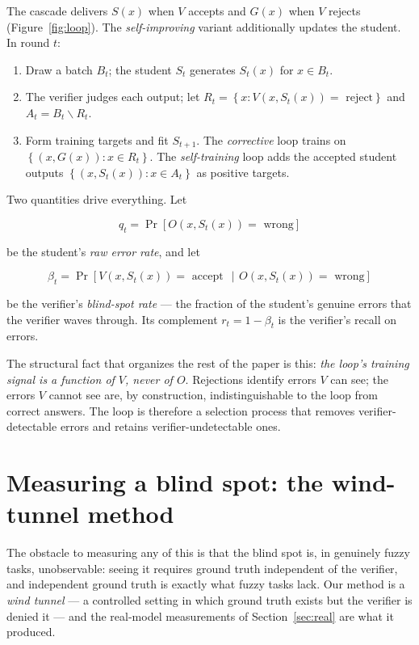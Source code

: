 \documentclass[11pt]{article}
\begin{document}
The cascade delivers \(S(x)\) when \(V\) accepts and \(G(x)\) when \(V\)
rejects (Figure~\ref{fig:loop}). The \emph{self-improving} variant
additionally updates the student. In round \(t\):

\begin{enumerate}
\item
  Draw a batch \(B_{t}\); the student \(S_{t}\) generates \(S_t(x)\)
  for \(x \in B_{t}\).
\item
  The verifier judges each output; let
  \(R_{t} = \left\{ x:V\left( x,S_t(x) \right) = \text{ reject} \right\}\)
  and \(A_{t} = B_{t} \smallsetminus R_{t}\).
\item
  Form training targets and fit \(S_{t + 1}\). The \emph{corrective}
  loop trains on \(\left\{ \left( x,G(x) \right):x \in R_{t} \right\}\).
  The \emph{self-training} loop adds the accepted student outputs
  \(\left\{ \left( x,S_t(x) \right):x \in A_{t} \right\}\) as positive
  targets.
\end{enumerate}

Two quantities drive everything. Let

\[q_{t} = \Pr\left\lbrack O\left( x,S_t(x) \right) = \text{ wrong} \right\rbrack\]

be the student's \emph{raw error rate}, and let

\[\beta_{t} = \Pr\left\lbrack V\left( x,S_t(x) \right) = \text{ accept }\,~|~\, O\left( x,S_t(x) \right) = \text{ wrong} \right\rbrack\]

be the verifier's \emph{blind-spot rate} --- the fraction of the
student's genuine errors that the verifier waves through. Its complement
\(r_{t} = 1 - \beta_{t}\) is the verifier's recall on errors.

The structural fact that organizes the rest of the paper is this:
\emph{the loop's training signal is a function of \(V\), never of
\(O\)}. Rejections identify errors \(V\) can see; the errors \(V\)
cannot see are, by construction, indistinguishable to the loop from
correct answers. The loop is therefore a selection process that removes
verifier-detectable errors and retains verifier-undetectable ones.

\section{Measuring a blind spot: the wind-tunnel method}

\protect{}\label{sec:design}{}

The obstacle to measuring any of this is that the blind spot is, in
genuinely fuzzy tasks, unobservable: seeing it requires ground truth
independent of the verifier, and independent ground truth is exactly
what fuzzy tasks lack. Our method is a \emph{wind tunnel} --- a
controlled setting in which ground truth exists but the verifier is
denied it --- and the real-model measurements of Section~\ref{sec:real}
are what it produced.
\end{document}
